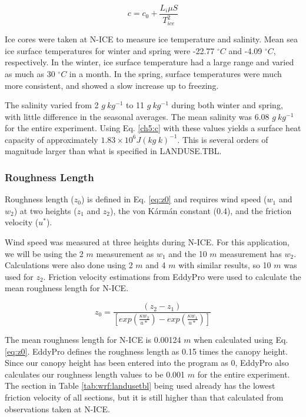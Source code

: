 \begin{equation}\label{ch5:c}
c = c_{0} + \frac{L_{i}\mu S}{T_{ice}^{2}}
\end{equation}

Ice cores were taken at N-ICE to measure ice temperature and salinity. Mean sea ice surface temperatures for winter and spring were -22.77 $^{\circ}C$ and -4.09 $^{\circ}C$, respectively. In the winter, ice surface temperature had a large range and varied as much as 30 $^{\circ}C$ in a month. In the spring, surface temperatures were much more consistent, and showed a slow increase up to freezing.

The salinity varied from 2 $g~kg^{-1}$ to 11 $g~kg^{-1}$ during both winter and spring, with little difference in the seasonal averages. The mean salinity was 6.08 $g~kg^{-1}$ for the entire experiment. Using Eq. \ref{ch5:c} with these values yields a surface heat capacity of approximately $1.83 \times 10^{6} J(kg~k)^{-1}$. This is several orders of magnitude larger than what is specified in LANDUSE.TBL.

\subsubsection{Roughness Length}
Roughness length ($z_{0}$) is defined in Eq. \ref{eq:z0} and requires wind speed ($w_{1}$ and $w_{2}$) at two heights ($z_{1}$ and $z_{2}$), the von K\'{a}rm\'{a}n constant (0.4), and the friction velocity ($u^{*}$). 

Wind speed was measured at three heights during N-ICE. For this application, we will be using the 2 $m$ measurement as $w_{1}$ and the 10 $m$ measurement has $w_{2}$. Calculations were also done using 2 $m$ and 4 $m$ with similar results, so 10 $m$ was used for $z_{2}$. Friction velocity estimations from EddyPro were used to calculate the mean roughness length for N-ICE.

\begin{equation}\label{eq:z0}
 z_{0} = \frac{(z_{2}-z_{1})}{[exp(\frac{\kappa w_{2}}{u*}) - exp(\frac{\kappa w_{1}}{u*})]} 
\end{equation}

The mean roughness length for N-ICE is 0.00124 $m$ when calculated using Eq. \ref{eq:z0}. EddyPro defines the roughness length as 0.15 times the canopy height. Since our canopy height has been entered into the program as 0, EddyPro also calculates our roughness length values to be 0.001 $m$ for the entire experiment. The section in Table \ref{tab:wrf:landusetbl} being used already has the lowest friction velocity of all sections, but it is still higher than that calculated from observations taken at N-ICE. 

